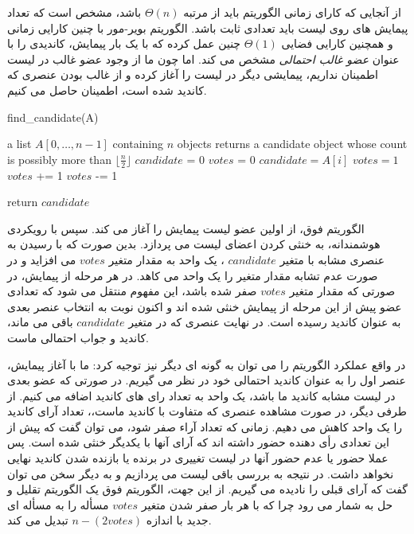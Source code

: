 \documentclass{article}
\begin{document}
از آنجایی که کارای زمانی الگوریتم باید از مرتبه
$\Theta(n)$
باشد، مشخص است که تعداد پیمایش های روی لیست باید تعدادی ثابت باشد.
الگوریتم بویر-مور با چنین کارایی زمانی و همچنین کارایی فضایی
$\Theta(1)$
چنین عمل کرده که با یک بار پیمایش، کاندیدی را با عنوان
\textit{عضو غالب احتمالی}
مشخص می کند. 
اما چون ما از وجود عضو غالب در لیست اطمینان نداریم،
پیمایشی دیگر در لیست را آغاز کرده و از غالب بودن عنصری که کاندید شده است،
اطمینان حاصل می کنیم.

\begin{latin}
    \begin{algorithm}[H]
        \caption*{find\_candidate(A)}
        \begin{algorithmic}
            \Require a list $A[0, \ldots, n-1]$ containing $n$ objects
            \Ensure returns a candidate object whose count is possibly more than $\lfloor \frac{n}{2} \rfloor$
            \State $candidate$ = 0
            \State $votes$ = 0
                    \State $candidate = A[i]$
                    \State $votes = 1$
                \Else
                        \State $votes$ += 1
                    \Else
                        \State $votes$ -= 1
                    \EndIf
                \EndIf
            \EndFor

            \State return $candidate$
        \end{algorithmic}
    \end{algorithm}
\end{latin}

الگوریتم فوق، از اولین عضو لیست پیمایش را آغاز می کند.
سپس با رویکردی هوشمندانه، به خنثی کردن اعضای لیست می پردازد. بدین صورت که
با رسیدن به عنصری مشابه با متغیر
$candidate$
، یک واحد به مقدار متغیر
$votes$
می افزاید و در صورت عدم تشابه 
مقدار متغیر را یک واحد می کاهد.
در هر مرحله از پیمایش، در صورتی که مقدار متغیر
$votes$
صفر شده باشد، این مفهوم منتقل می شود که تعدادی عضو پیش از این مرحله از
پیمایش خنثی شده اند و اکنون نوبت به انتخاب عنصر بعدی به عنوان کاندید رسیده است.
در نهایت عنصری که در متغیر
$candidate$
باقی می ماند، کاندید و جواب احتمالی ماست.

در واقع عملکرد الگوریتم را می توان به گونه ای دیگر نیز توجیه کرد: ما با آغاز پیمایش،
عنصر اول را به عنوان کاندید احتمالی خود در نظر می گیریم. در صورتی که عضو بعدی در لیست مشابه
کاندید ما باشد، یک واحد به تعداد رای های کاندید اضافه می کنیم.
از طرفی دیگر، در صورت مشاهده عنصری که متفاوت با کاندید ماست،، تعداد آرای کاندید را یک
واحد کاهش می دهیم. زمانی که تعداد آراء صفر شود، می توان گفت که پیش از این
تعدادی رأی دهنده حضور داشته اند که آرای آنها با یکدیگر خنثی شده است. پس عملا
حضور یا عدم حضور آنها در لیست تغییری در برنده یا بازنده شدن کاندید نهایی نخواهد داشت.
در نتیجه به بررسی باقی لیست می پردازیم و به دیگر سخن می توان گفت که آرای قبلی را
نادیده می گیریم. از این جهت، الگوریتم فوق یک الگوریتم تقلیل و حل به شمار می رود چرا که
با هر بار صفر شدن متغیر 
$votes$
مسأله را به مسأله ای جدید با اندازه
$n - (2votes)$
تبدیل می کند.
\end{document}
